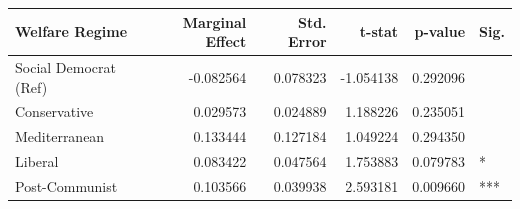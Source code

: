 \begin{tabular}{lrrrrl}
\toprule
Welfare Regime & Marginal Effect & Std. Error & t-stat & p-value & Sig. \\
\midrule
Social Democrat (Ref) & -0.082564 & 0.078323 & -1.054138 & 0.292096 &  \\
Conservative & 0.029573 & 0.024889 & 1.188226 & 0.235051 &  \\
Mediterranean & 0.133444 & 0.127184 & 1.049224 & 0.294350 &  \\
Liberal & 0.083422 & 0.047564 & 1.753883 & 0.079783 & * \\
Post-Communist & 0.103566 & 0.039938 & 2.593181 & 0.009660 & *** \\
\bottomrule
\end{tabular}
